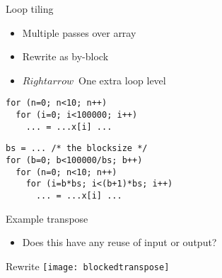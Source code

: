 \begin{numberedframe}{Loop tiling}
  \begin{itemize}
  \item Multiple passes over array
  \item Rewrite as by-block
  \item $Rightarrow$~One extra loop level
  \end{itemize}
  \begin{multicols}{2}
\footnotesize
  \begin{lstlisting}
for (n=0; n<10; n++)
  for (i=0; i<100000; i++)
    ... = ...x[i] ...

\end{lstlisting}
\columnbreak
\begin{lstlisting}
bs = ... /* the blocksize */
for (b=0; b<100000/bs; b++)
  for (n=0; n<10; n++)
    for (i=b*bs; i<(b+1)*bs; i++)
      ... = ...x[i] ...
\end{lstlisting}
  \end{multicols}
\end{numberedframe}

\begin{numberedframe}{Example transpose}
  \begin{itemize}
  \item Does this have any reuse of input or output?
  \end{itemize}
\end{numberedframe}

\begin{numberedframe}{Rewrite}
  \lstset{basicstyle=\scriptsize\ttfamily}
\texttt{[image: blockedtranspose]}
\end{numberedframe}

\endinput

\begin{numberedframe}{}
  \begin{itemize}
  \item 
  \end{itemize}
\begin{lstlisting}
\end{lstlisting}
\end{numberedframe}

